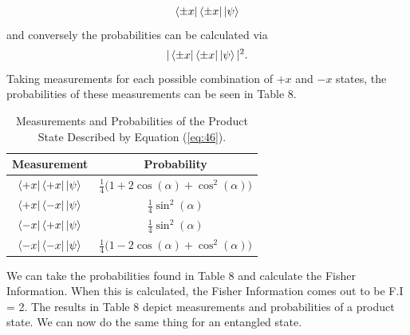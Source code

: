 \documentclass[twocolumn]{article}
\begin{document}
\begin{equation} \label{eq:49}
\bra{\pm x}\bra{\pm x}\ket{\psi}
\end{equation}
and conversely the probabilities can be calculated via
\begin{equation} \label{eq:50}
|\bra{\pm x}\bra{\pm x}\ket{\psi}|^2.
\end{equation}
Taking measurements for each possible combination of $+x$ and $-x$ states, the probabilities of these measurements can be seen in Table 8.
\newpage
\begin{table}[h!]
\begin{center}
\begin{tabular}{ |c|c| }
\hline Measurement & Probability \\
\hline $\bra{+x}\bra{+x}\ket{\psi}$ & $\frac{1}{4}\big(1+2\cos{(\alpha)}+\cos^2{(\alpha)}\big)$ \\
\hline $\bra{+x}\bra{-x}\ket{\psi}$ & $\frac{1}{4}\sin^2{(\alpha)}$ \\
\hline $\bra{-x}\bra{+x}\ket{\psi}$ & $\frac{1}{4}\sin^2{(\alpha)}$ \\
\hline $\bra{-x}\bra{-x}\ket{\psi}$ & $\frac{1}{4}\big(1-2\cos{(\alpha)}+\cos^2{(\alpha)}\big)$ \\
\hline
\end{tabular}
\caption{Measurements and Probabilities of the Product State Described by Equation (\ref{eq:46}).}
\end{center}
\end{table} 
We can take the probabilities found in Table 8 and calculate the Fisher Information. When this is calculated, the Fisher Information comes out to be F.I = 2. The results in Table 8 depict measurements and probabilities of a product state. We can now do the same thing for an entangled state.
\end{document}
